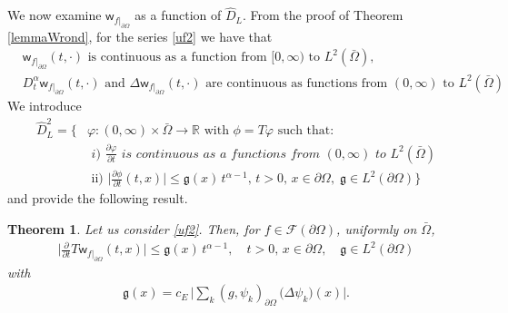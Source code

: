 \documentclass[11pt,a4paper]{article}
\newtheorem{theorem}{Theorem}[section]
\begin{document}
We now examine $\mathsf{w}_{f|_{\partial \Omega}}$ as a function of $\hat{D}_L$. From the proof of Theorem \ref{lemmaWrond}, for the series \eqref{uf2} we have that
\begin{align*}
& \textrm{$\mathsf{w}_{f|_{\partial \Omega}}(t, \cdot)$  is continuous as a function from $[0, \infty)$ to $L^2(\bar{\Omega})$},\\
& \textrm{$D^\alpha_t \mathsf{w}_{f|_{\partial \Omega}}(t, \cdot)$ and $\Delta \mathsf{w}_{f|_{\partial \Omega}}(t, \cdot)$ are continuous as functions from $(0, \infty)$ to $L^2(\bar{\Omega})$}.
\end{align*}
We introduce 
\begin{align*}
\hat{D}^2_L = \bigg\{ & \varphi: (0, \infty) \times \bar{\Omega} \to \mathbb{R} \textrm{ with $\phi = T\varphi$ such that: } \\
 & \textit{ i) $\frac{\partial \varphi}{\partial t}$ is continuous as a functions from $(0, \infty)$ to $L^2(\bar{\Omega})$} \\
 &  \textrm{ ii) } \Big| \frac{\partial \phi}{\partial t}(t,x) \Big| \leq \mathfrak{g}(x)\, t^{\alpha-1}, \,  t>0, \, x \in \partial \Omega,\;   \mathfrak{g} \in L^2(\partial \Omega) \bigg\}
\end{align*}
and provide the following result.
\begin{theorem}
Let us consider \eqref{uf2}. Then, for $f \in \mathcal{F}(\partial \Omega)$, uniformly on $\bar{\Omega}$,
\begin{align}
\Big| \frac{\partial}{\partial t} T \mathsf{w}_{f|_{\partial \Omega}}(t,x) \Big| \leq \mathfrak{g}(x)\, t^{\alpha-1}, \quad t>0,\, x \in \partial \Omega, \quad \mathfrak{g} \in L^2(\partial \Omega) \label{Ip2Dhat2}
\end{align}
with
\begin{align*}
\mathfrak{g}(x) = c_E\, \Big| \sum_k  (g, \psi_k)_{\partial \Omega}\, \big(\Delta \psi_k\big)(x) \Big|.
\end{align*}
\label{ThmDhatL2}
\end{theorem}
\end{document}
